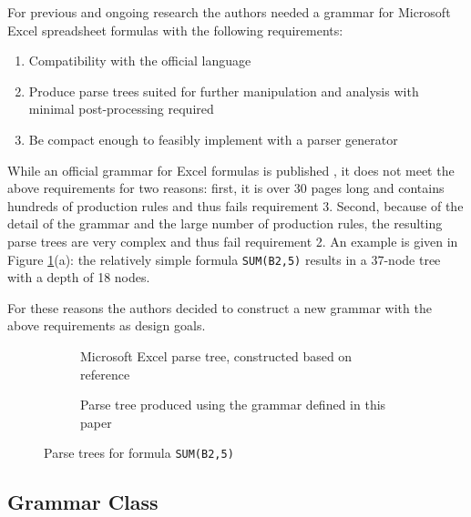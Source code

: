 \documentclass[conference]{IEEEtran}
\begin{document}
For previous and ongoing research the authors needed a grammar for Microsoft Excel spreadsheet formulas with the following requirements:

\label{sec:designgoals}
\begin{enumerate}
\item Compatibility with the official language
\item Produce parse trees suited for further manipulation and analysis with minimal post-processing required
\item Be compact enough to feasibly implement with a parser generator
\end{enumerate}

While an official grammar for Excel formulas is published \cite{ExcelOfficialGrammar}, it does not meet the above requirements for two reasons: first, it is over 30 pages long and contains hundreds of production rules and thus fails requirement 3.
Second, because of the detail of the grammar and the large number of production rules, the resulting parse trees are very complex and thus fail requirement 2.
An example is given in Figure \ref{figure:parsetrees}(a): the relatively simple formula \texttt{SUM(B2,5)} results in a 37-node tree with a depth of 18 nodes.

For these reasons the authors decided to construct a new grammar with the above requirements as design goals.

\begin{figure}
	\centering
	\begin{subfigure}[b]{0.3\textwidth}
		\hspace{-2em}
		\scalebox{.7}{
			
		}
		\caption{Microsoft Excel parse tree, constructed based on reference \cite{ExcelOfficialGrammar}}
	\end{subfigure}
	\begin{subfigure}[b]{0.3\textwidth}
		\vspace{1em}
		\hspace{-0.5em}
		\scalebox{.7}{
			
		}
		\caption{Parse tree produced using the grammar defined in this paper}
	\end{subfigure}
	\caption{Parse trees for formula \texttt{SUM(B2,5)}}
	\label{figure:parsetrees}
\end{figure}

\subsection{Grammar Class}
\end{document}
